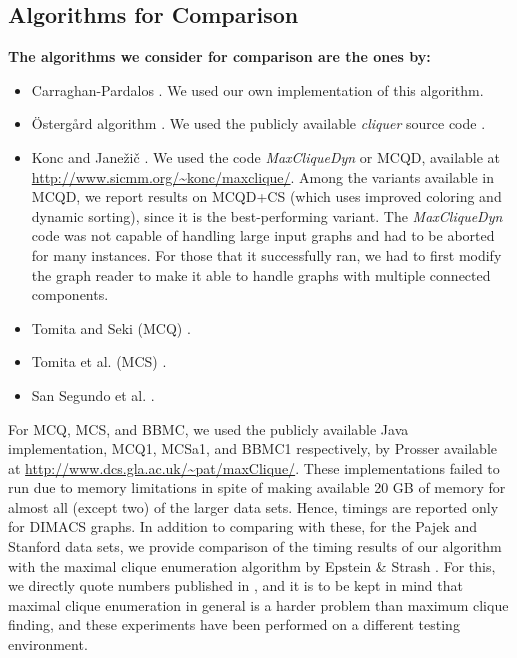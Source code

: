 

\subsection{Algorithms for Comparison}
{\bf The algorithms we consider for comparison are the ones by: 
\begin{itemize}
\item Carraghan-Pardalos \cite{pardalos}. We used our own implementation of this algorithm.
\item \"{O}sterg{\aa}rd algorithm \cite{ostergard}. We used the publicly available {\it cliquer} source code \cite{cliquer}.
\item Konc and Jane\v{z}i\v{c} \cite{konc2007improved}. We used the code {\it MaxCliqueDyn} or MCQD, available at \\{\small \url{http://www.sicmm.org/~konc/maxclique/}}. Among the variants available in MCQD, we report results on MCQD+CS (which uses improved coloring and dynamic sorting), since it is the best-performing variant. The {\it MaxCliqueDyn} code was not capable of handling large input graphs and had to be aborted for many instances. For those that it successfully ran, we had to first modify the graph reader to make it able to handle graphs with multiple connected components.
\item Tomita and Seki (MCQ) \cite{citeulike:7905505}.
\item Tomita et al. (MCS) \cite{walcom}.
\item San Segundo et al. \cite{SanSegundo}.
\end{itemize}
For MCQ, MCS, and BBMC, we used the publicly available Java implementation, MCQ1, MCSa1, and BBMC1 respectively, by Prosser \cite{prosser2012}  available at {\small \url{http://www.dcs.gla.ac.uk/~pat/maxClique/}}. These implementations failed to run due to memory limitations in spite of making available 20 GB of memory for almost all (except two) of the larger data sets. Hence, timings are reported only for DIMACS graphs. In addition to comparing with these, for the Pajek and Stanford data sets, we provide comparison of the timing results of our algorithm with the maximal clique enumeration algorithm by Epstein \& Strash \cite{sea}. For this, we directly quote numbers published in \cite{sea}, and it is to be kept in mind that maximal clique enumeration in general is a harder problem than maximum clique finding, and these experiments have been performed on a different testing environment.
}

